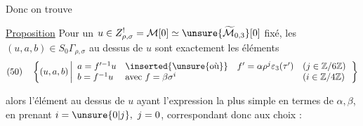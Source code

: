 Donc on trouve

\uline{Proposition}
Pour un \(u\in Z_{\rho,\sigma}^{!}=\mathcal M[0]
\simeq\unsure{\widetilde{\mathcal M}_{0,3}}[0]\) fixé,
les \((u,a,b)\in S_0\Gamma_{\rho,\sigma}\) au dessus de \(u\)
sont exactement les éléments 
\[
(50)\quad
\left\{(u,a,b)\left|\begin{array}{lll}
a=f'^{-1}u&\inserted{\text{\unsure{où}}}\quad
 f'=\alpha\rho^j\varepsilon_3(\tau')&(j\in\mathbb Z/6\mathbb Z)\\
b=f^{-1}u&\text{avec }f=\beta\sigma^i&(i\in\mathbb Z/4\mathbb Z)
\end{array}\right.\right\}
\]

 alors l'élément
 au dessus de \(u\)
ayant l'expression la plus simple en termes de \(\alpha,\beta\),
en prenant \(i=\unsure{0|j},\ j=0\), correspondant donc aux choix :

